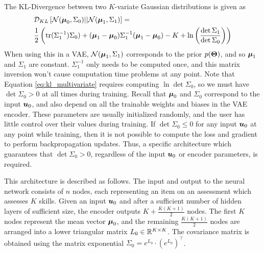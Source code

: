 The KL-Divergence between two $K$-variate Gaussian distributions is given as
\begin{equation}
\begin{split}
  &\mathcal{D}_{KL}\left[\mathcal{N}(\boldsymbol{\mu}_0, \Sigma_0) || \mathcal{N}(\boldsymbol{\mu}_1, \Sigma_1) \right] = \\
&\frac{1}{2} \left( \text{tr}(\Sigma_1^{-1}) \Sigma_0) + (\boldsymbol{\mu}_1 - \boldsymbol{\mu}_0) \Sigma_1^{-1} (\boldsymbol{\mu}_1 - \boldsymbol{\mu}_0) - K + \ln\left( \frac{\det \Sigma_1}{\det \Sigma_0 }\right) \right)
  \label{eq:kl_multivariate}
\end{split}
\end{equation}
When using this in a VAE, $\mathcal{N}(\boldsymbol{\mu}_1, \Sigma_1)$ corresponds to the prior $p(\boldsymbol{\Theta})$, and so $\boldsymbol{\mu}_1$ and $\Sigma_1$ are constant. $\Sigma_1^{-1}$ only needs to be computed once, and this matrix inversion won't cause computation time problems at any point. Note that Equation \ref{eq:kl_multivariate} requires computing $\ln \det \Sigma_0$, so we must have $\det \Sigma_0 > 0$ at all times during training. Recall that $\boldsymbol{\mu}_0$ and $\Sigma_0$ correspond to the input $\boldsymbol{u}_0$, and also depend on all the trainable weights and biases in the VAE encoder. These parameters are usually initialized randomly, and the user has little control over their values during training. If $\det \Sigma_0 \leq 0$ for any input $\boldsymbol{u}_0$ at any point while training, then it is not possible to compute the loss and gradient to perform backpropagation updates. Thus, a specific architecture which guarantees that $\det \Sigma_0 > 0$, regardless of the input $\boldsymbol{u}_0$ or encoder parameters, is required.

This architecture is described as follows. The input and output to the neural network consists of $n$ nodes, each representing an item on an assessment which assesses $K$ skills. Given an input $\boldsymbol{u}_0$ and after a sufficient number of hidden layers of sufficient size, the encoder outputs $K + \frac{K(K+1)}{2}$ nodes. The first $K$ nodes represent the mean vector $\boldsymbol{\mu}_0$, and the remaining $\frac{K(K+1)}{2}$ nodes are arranged into a lower triangular matrix $L_0 \in \mathbb{R}^{K\times K}$. The covariance matrix is obtained using the matrix exponential $\Sigma_0 = e^{L_0} \cdot \left( e^{L_0} \right)^\top$.

